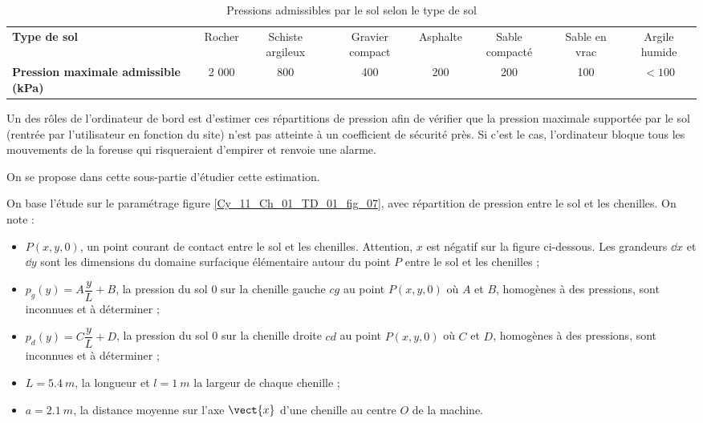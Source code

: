  \begin{table*}
\footnotesize{
\begin{tabular}{p{3cm}ccccccc}
\hline
\textbf{Type de sol} & Rocher & Schiste argileux & Gravier compact & Asphalte & Sable compacté & Sable en 
vrac & Argile humide \\
\textbf{Pression 
maximale 
admissible (kPa)} & 2 000 & 800 & 400&  200&  200&  100 & $<100$ \\ \hline
\end{tabular}}
\caption{Pressions admissibles par le sol selon le type de sol \label{Cy_11_Ch_01_TD_01_tab_01}}
\end{table*}


Un des rôles de l’ordinateur de bord est 
d’estimer ces répartitions de pression 
afin de vérifier que la pression 
maximale supportée par le sol (rentrée 
par l’utilisateur en fonction du site) n’est 
pas atteinte à un coefficient de sécurité 
près. 
Si c’est le cas, l’ordinateur bloque tous 
les mouvements de la foreuse qui 
risqueraient d’empirer et renvoie une 
alarme. 


 
On se propose dans cette sous-partie 
d’étudier cette estimation. 
 
 On base l’étude sur le paramétrage figure \ref{Cy_11_Ch_01_TD_01_fig_07}, avec répartition de 
pression entre le sol et les chenilles. On note : 
\begin{itemize}
\item $P(x,y,0)$, un point courant de contact entre le sol et les chenilles. Attention, $x$ est négatif sur la 
figure ci-dessous. Les grandeurs $\dd x$ et $\dd y$ sont les dimensions du domaine surfacique élémentaire autour du point $P$ entre le sol et les chenilles ; 
\item $p_g(y)= A \dfrac{y}{L}+B$, la pression du sol 0 sur la chenille gauche $cg$ au point $P(x,y,0)$ où $A$ et $B$, homogènes à des pressions, sont inconnues et à déterminer ; 
\item $p_d(y)= C \dfrac{y}{L}+D$, la pression du sol 0 sur la chenille droite $cd$ au point $P(x,y,0)$ où $C$ et $D$, 
homogènes à des pressions, sont inconnues et à déterminer ; 
\item $L = \SI{5,4}{m}$, la longueur et $l = \SI{1}{m}$ la largeur de chaque chenille ; 
\item $a = \SI{2,1}{m}$, la distance moyenne sur l’axe $\vect{x}$ d’une chenille au centre $O$ de la machine. 
\end{itemize}

